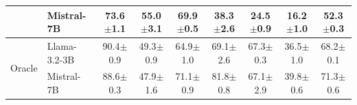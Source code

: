 \begin{table}[t]
\begin{tabular}{@{}ll cccccc c@{}}
  & Mistral-7B     & 73.6{\scriptsize$\pm$1.1} & 55.0{\scriptsize$\pm$3.1} & 69.9{\scriptsize$\pm$0.5} & 38.3{\scriptsize$\pm$2.6} & 24.5{\scriptsize$\pm$0.9} & 16.2{\scriptsize$\pm$1.0} & 52.3{\scriptsize$\pm$0.3} \\
\midrule
\multirow{2}{*}{Oracle}
  & Llama-3.2-3B   & 90.4{\scriptsize$\pm$0.9} & 49.3{\scriptsize$\pm$0.9} & 64.9{\scriptsize$\pm$1.0} & 69.1{\scriptsize$\pm$2.6} & 67.3{\scriptsize$\pm$0.3} & 36.5{\scriptsize$\pm$1.0} & 68.2{\scriptsize$\pm$0.1} \\

  & Mistral-7B     & 88.6{\scriptsize$\pm$0.3} & 47.9{\scriptsize$\pm$1.6} & 71.1{\scriptsize$\pm$0.9} & 81.8{\scriptsize$\pm$0.8} & 67.1{\scriptsize$\pm$2.9} & 39.8{\scriptsize$\pm$0.6} & 71.3{\scriptsize$\pm$0.6} \\
\bottomrule
\end{tabular}
\end{table}
